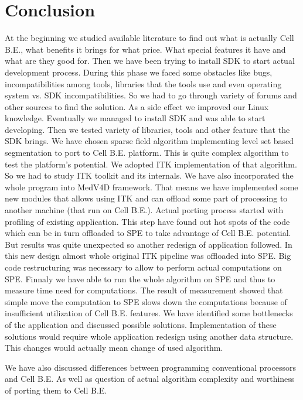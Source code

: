 \chapter{Conclusion}

At the beginning we studied available literature to find out what is actually Cell B.E., what benefits it brings for what price.
What special features it have and what are they good for.
Then we have been trying to install SDK to start actual development process.
During this phase we faced some obstacles like bugs, incompatibilities among tools, libraries that the tools use and even operating system vs. SDK incompatibilities.
So we had to go through variety of forums and other sources to find the solution.
As a side effect we improved our Linux knowledge.
Eventually we managed to install SDK and was able to start developing.
Then we tested variety of libraries, tools and other feature that the SDK brings.
We have chosen sparse field algorithm implementing level set based segmentation to port to Cell B.E. platform.
This is quite complex algorithm to test the platform's potential.
We adopted ITK implementation of that algorithm.
So we had to study ITK toolkit and its internals.
We have also incorporated the whole program into MedV4D framework.
That means we have implemented some new modules that allows using ITK and can offload some part of processing to another machine (that run on Cell B.E.).
Actual porting process started with profiling of existing application.
This step have found out hot spots of the code which can be in turn offloaded to SPE to take advantage of Cell B.E. potential.
But results was quite unexpected so another redesign of application followed.
In this new design almost whole original ITK pipeline was offloaded into SPE.
Big code restructuring was necessary to allow to perform actual computations on SPE.
Finnaly we have able to run the whole algorithm on SPE and thus to measure time need for computations.
The result of measurement showed that simple move the computation to SPE slows down the computations because of insufficient utilization of Cell B.E. features.
We have identified some bottlenecks of the application and discussed possible solutions.
Implementation of these solutions would require whole application redesign using another data structure.
This changes would actually mean change of used algorithm.

\par
We have also discussed differences between programming conventional processors and Cell B.E.
As well as question of actual algorithm complexity and worthiness of porting them to Cell B.E.


